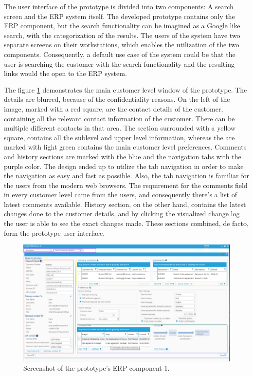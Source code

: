\documentclass[12pt,a4paper,oneside,pdftex]{report}
\begin{document}
The user interface of the prototype is divided into two components: A search screen and the ERP system itself. The developed prototype contains only the ERP component, but the search functionality can be imagined as a Google like search, with the categorization of the results. The users of the system have two separate screens on their workstations, which enables the utilization of the two components. Consequently, a default use case of the system could be that the user is searching the customer with the search functionality and the resulting links would the open to the ERP system. 

The figure \ref{fig:protooneimg} demonstrates the main customer level window of the prototype. The details are blurred, because of the confidentiality reasons. On the left of the image, marked with a red square, are the contact details of the customer, containing all the relevant contact information of the customer. There can be multiple different contacts in that area. The section surrounded with a yellow square, contains all the sublevel and upper level information, whereas the are marked with light green contains the main customer level preferences. Comments and history sections are marked with the blue and the navigation tabs with the purple color. The design ended up to utilize the tab navigation in order to make the navigation as easy and fast as possible. Also, the tab navigation is familiar for the users from the modern web browsers. The requirement for the comments field in every customer level came from the users, and consequently there's a list of latest comments available. History section, on the other hand, contains the latest changes done to the customer details, and by clicking the visualized change log the user is able to see the exact changes made. These sections combined, de facto, form the prototype user interface.

\begin{figure}[H]

  	\centerline{
    	   \includegraphics[width=1.3\textwidth]{./images/proto_main.png}
    	   }
  	   \caption{Screenshot of the prototype's ERP component 1.}
	   \label{fig:protooneimg}
\end{figure}
\end{document}
